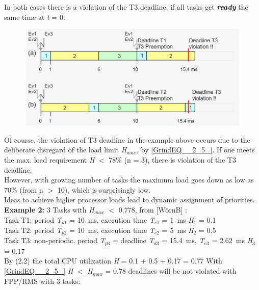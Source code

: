 In both cases there is a violation of the T3 deadline, if all tasks get \textbf{\textit{ready}} the same time at \textit{t} = 0: 

 	\begin{figure}[h]
    \centering
    \includegraphics[width=12cm, height=5cm]{Images/image100.png}
    \label{fig:Fig }
    \end{figure}
    
Of course, the violation of T3 deadline in the example above occurs due to the deliberate disregard of the load limit \textit{H${}_{max}$}, by \eqref{GrindEQ__2_5_}. If one meets the max. load requirement \textit{H} $\mathrm{<}$ 78\% (n = 3), there is violation of the T3 deadline.\\

However, with growing number of tasks the maximum load goes down as low as 70\% (from n $\mathrm{>}$ 10), which is surprisingly low.\\

Ideas to achieve higher processor loads lead to dynamic assignment of priorities.\\

 \textbf{Example 2:} 3 Tasks with \textit{H}${}_{max}$ $\mathrm{<}$ 0.778, from [W\"{o}rnB] :\\
Task T1: period \textit{T}${}_{p1}$ = 10~ms, execution time \textit{T}${}_{e1}$ = 1~ms  \textit{H}${}_{1}$ = 0.1\\
Task T2: period \textit{T}${}_{p2}$ = 10~ms, execution time\textit{ T}${}_{e2}$ = 5~ms  \textit{H}${}_{2}$ = 0.5\\
Task T3: non-periodic, period \textit{T}${}_{p3}$ = deadline \textit{T}${}_{d3}$ = 15.4~ms, \textit{T}${}_{e3}$ = 2.62~ms  \textit{H}${}_{3}$ = 0.17\\

By (2.2) the total CPU utilization \textit{H} = 0.1 + 0.5 + 0.17 = 0.77 With \eqref{GrindEQ__2_5_} \textit{H} $\mathrm{<}$ \textit{H}${}_{max}$ = 0.78 deadlines will be not violated with FPP/RMS with 3 tasks:\\

